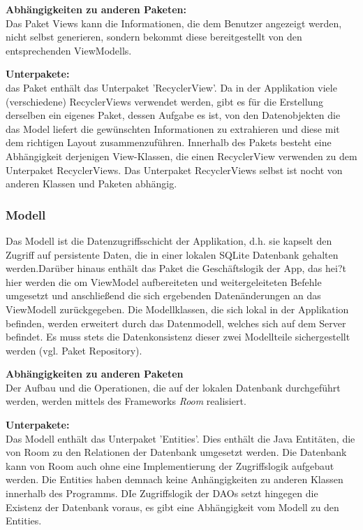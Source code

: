 \textbf{Abhängigkeiten zu anderen Paketen:}\\
Das Paket Views kann die Informationen, die dem Benutzer angezeigt werden, nicht selbst generieren, sondern bekommt diese bereitgestellt von den entsprechenden ViewModells.

\textbf{Unterpakete:}\\
das Paket enthält das Unterpaket 'RecyclerView'. Da in der Applikation viele (verschiedene) RecyclerViews verwendet werden, gibt es für die Erstellung derselben ein eigenes Paket, dessen Aufgabe es ist, von den Datenobjekten die das Model liefert die gewünschten Informationen zu extrahieren und diese mit dem richtigen Layout zusammenzuführen. Innerhalb des Pakets besteht eine Abhängigkeit derjenigen View-Klassen, die einen RecyclerView verwenden zu dem Unterpaket RecyclerViews. Das Unterpaket RecyclerViews selbst ist nocht von anderen Klassen und Paketen abhängig.

\subsubsection{Modell}
Das Modell ist die Datenzugriffsschicht der Applikation, d.h. sie kapselt den Zugriff auf persistente Daten, die in einer lokalen SQLite Datenbank gehalten werden.Darüber hinaus enthält das Paket die Geschäftslogik der App, das hei?t hier werden die om ViewModel aufbereiteten und weitergeleiteten Befehle umgesetzt und anschließend die sich ergebenden Datenänderungen an das ViewModell zurückgegeben. Die Modellklassen, die sich lokal in der Applikation befinden, werden erweitert durch das Datenmodell, welches sich auf dem Server befindet. Es muss stets die Datenkonsistenz dieser zwei Modellteile sichergestellt werden (vgl. Paket Repository).

\textbf{Abhängigkeiten zu anderen Paketen}\\
Der Aufbau und die Operationen, die auf der lokalen Datenbank durchgeführt werden, werden mittels des Frameworks \textit{Room} realisiert.

\textbf{Unterpakete:}\\
Das Modell enthält das Unterpaket 'Entities'. Dies enthält die Java Entitäten, die von Room zu den Relationen der Datenbank umgesetzt werden. Die Datenbank kann von Room auch ohne eine Implementierung der Zugriffslogik aufgebaut werden. Die Entities haben demnach keine Anhängigkeiten zu anderen Klassen innerhalb des Programms. DIe Zugriffslogik der DAOs setzt hingegen die Existenz der Datenbank voraus, es gibt eine Abhängigkeit vom Modell zu den Entities.

